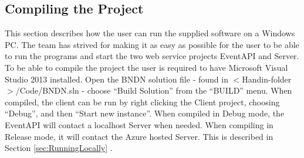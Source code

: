\subsection{Compiling the Project}
This section describes how the user can run the supplied software on a Windows PC. \newline
The team has strived for making it as easy as possible for the user to be able to run the programs and start the two web service projects EventAPI and Server. \newline
To be able to compile the project the user is required to have Microsoft Visual Studio 2013 installed. Open the BNDN solution file - found in $<$Handin-folder$>$/Code/BNDN.sln - choose “Build Solution” from the “BUILD” menu. \newline
When compiled, the client can be run by right clicking the Client project, choosing “Debug”, and then “Start new instance”. \newline
When compiled in Debug mode, the EventAPI will contact a localhost Server when needed. When compiling in Release mode, it will contact the Azure hosted Server. This is described in Section \ref{sec:RunningLocally} .